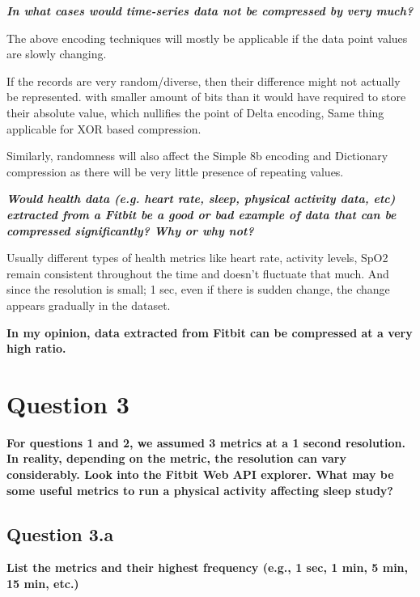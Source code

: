 \documentclass[a4paper, 12pt]{article}
\begin{document}
\vspace{0.5em}

\textbf{\textit{In what cases would time-series data not be compressed by very much?}}

\vspace{0.5em}

The above encoding techniques will mostly be applicable if the data point values are slowly changing.

If the records are very random/diverse, then their difference might not actually be represented. with smaller amount of bits than it would have required to store their absolute value, which nullifies the point of Delta encoding, Same thing applicable for XOR based compression.

Similarly, randomness will also affect the Simple 8b encoding and Dictionary compression as there will be very little presence of repeating values.

\vspace{0.5em}

\textbf{\textit{Would health data (e.g. heart rate, sleep, physical activity data, etc)
extracted from a Fitbit be a good or bad example of data that can be
compressed significantly? Why or why not?}}

\vspace{0.5em}

Usually different types of health metrics like heart rate, activity levels, SpO2 remain consistent throughout the time and doesn't fluctuate that much. And since the resolution is small; 1 sec, even if there is sudden change, the change appears gradually in the dataset. 

\textbf{In my opinion, data extracted from Fitbit can be compressed at a very high ratio.}

\break

\section*{Question 3}
\textbf{For questions 1 and 2, we assumed 3 metrics at a 1 second resolution. In reality,
depending on the metric, the resolution can vary considerably. Look into the Fitbit Web
API explorer. What may be some useful metrics to run a physical activity affecting sleep
study?}

\subsection*{Question 3.a}
\textbf{List the metrics and their highest frequency (e.g., 1 sec, 1 min, 5 min, 15 min, etc.)}
\end{document}
